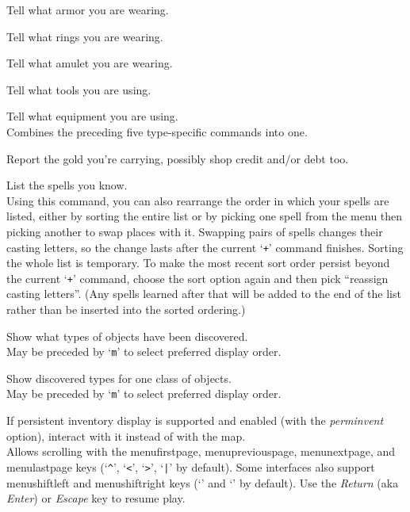 \documentclass[titlepage]{article}
\begin{document}
\begin{description}[font=\mdseries\ttfamily]
Tell what armor you are wearing.
\item[=]
Tell what rings you are wearing.
\item["]
Tell what amulet you are wearing.
\item[(]
Tell what tools you are using.
\item[*]
Tell what equipment you are using.\\
Combines the preceding five type-specific
commands into one.
\item[\$]
Report the gold you're carrying, possibly shop credit and/or debt too.
\item[+]
List the spells you know.\\
Using this command, you can also rearrange
the order in which your spells are listed, either by sorting the entire
list or by picking one spell from the menu then picking another to swap
places with it.  Swapping pairs of spells changes their casting letters,
so the change lasts after the current `\texttt{+}' command finishes.  Sorting
the whole list is temporary.  To make the most recent sort order persist
beyond the current `\texttt{+}' command, choose the sort option again and then
pick ``reassign casting letters''.  (Any spells learned after that will
be added to the end of the list rather than be inserted into the sorted
ordering.)
\item[\textbackslash]
Show what types of objects have been discovered.
\\
May be preceded by `\texttt{m}' to select preferred display order.
\item[\textasciigrave]
Show discovered types for one class of objects.
\\
May be preceded by `\texttt{m}' to select preferred display order.

\item[|]
If persistent inventory display is supported and enabled (with the
\textit{perm\textunderscore invent}
option), interact with it instead of with the map.
\\
Allows scrolling with the
menu\textunderscore first\textunderscore page, menu\textunderscore previous\textunderscore page,
menu\textunderscore next\textunderscore page, and menu\textunderscore last\textunderscore page
keys (`\texttt{\textasciicircum}', `\texttt{<}', `\texttt{>}', `\texttt{|}' by default).
Some interfaces also support menu\textunderscore shift\textunderscore left and menu\textunderscore shift\textunderscore right
keys (`\texttt{\textbraceleft}' and `\texttt{\textbraceright}' by default).
Use the \textit{Return} (aka \textit{Enter}) or \textit{Escape} key to
resume play.


\end{description}
\end{document}
